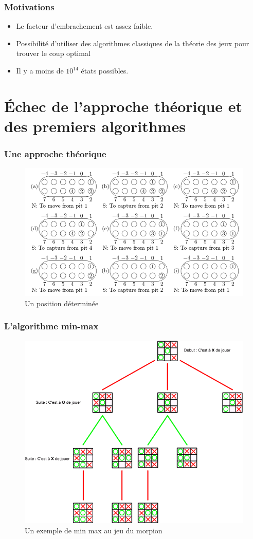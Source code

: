 \message{ !name(test.tex)}\documentclass{beamer}
\begin{document}
\begin{frame}
  \frametitle{Motivations}
  \begin{itemize}
  \item Le facteur d'embrachement est assez faible.
  \item Possibilité d'utiliser des algorithmes classiques de la théorie des jeux pour trouver le coup optimal
  \item Il y a moins de $10^{14}$ états possibles.
  \end{itemize}
\end{frame}

\section{Échec de l'approche théorique et des premiers algorithmes}
\begin{frame}
  \frametitle{Une approche théorique}
  \begin{figure}
    \centering
    \includegraphics[width=\linewidth]{ressources/determined_positions.png}
    \caption{Un position déterminée}
  \end{figure}
\end{frame}

\begin{frame}
  \frametitle{L'algorithme min-max}
  \begin{figure}
    \centering
    \includegraphics[width=0.6\linewidth]{ressources/explication_min_max.png}
    \caption{Un exemple de min max au jeu du morpion}
  \end{figure}
\end{frame}
\end{document}
